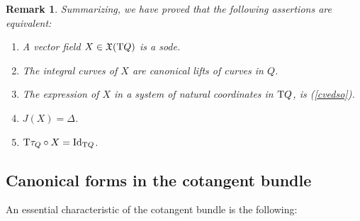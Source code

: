 \documentclass[12pt]{report}
\newtheorem{remark}[teor]{Remark}
\def\vf{\mathfrak X}
\def\Tan{{\rm T}}
\begin{document}
\begin{remark}{\rm 
Summarizing, we have proved that the following assertions are equivalent:
\begin{enumerate}
\item
A vector field $X\in\vf(\Tan Q)$ is a {\sc sode}.
\item
The integral curves of $X$ are canonical lifts of curves in $Q$.
\item
The expression of $X$ in a system of natural coordinates in $\Tan Q$,
is (\ref{cvedso}).
\item
$J(X)=\Delta$.
\item
$\Tan\tau_Q\circ X ={\rm Id}_{\Tan Q}$.
\end{enumerate}
}\end{remark}


\subsection{Canonical forms in the cotangent bundle}


An essential characteristic of the
cotangent bundle is the following:
\end{document}
